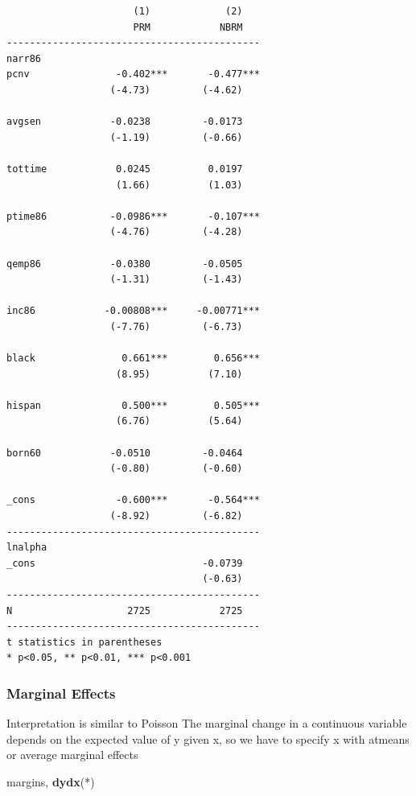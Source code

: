 \documentclass[
]{book}
\newenvironment{Shaded}{\begin{snugshade}}{\end{snugshade}}
\newcommand{\KeywordTok}[1]{\textcolor[rgb]{0.13,0.29,0.53}{\textbf{#1}}}
\newcommand{\NormalTok}[1]{#1}
\begin{document}
\begin{verbatim}
                      (1)             (2)   
                      PRM            NBRM   
--------------------------------------------
narr86                                      
pcnv               -0.402***       -0.477***
                  (-4.73)         (-4.62)   

avgsen            -0.0238         -0.0173   
                  (-1.19)         (-0.66)   

tottime            0.0245          0.0197   
                   (1.66)          (1.03)   

ptime86           -0.0986***       -0.107***
                  (-4.76)         (-4.28)   

qemp86            -0.0380         -0.0505   
                  (-1.31)         (-1.43)   

inc86            -0.00808***     -0.00771***
                  (-7.76)         (-6.73)   

black               0.661***        0.656***
                   (8.95)          (7.10)   

hispan              0.500***        0.505***
                   (6.76)          (5.64)   

born60            -0.0510         -0.0464   
                  (-0.80)         (-0.60)   

_cons              -0.600***       -0.564***
                  (-8.92)         (-6.82)   
--------------------------------------------
lnalpha                                     
_cons                             -0.0739   
                                  (-0.63)   
--------------------------------------------
N                    2725            2725   
--------------------------------------------
t statistics in parentheses
* p<0.05, ** p<0.01, *** p<0.001
\end{verbatim}

\subsubsection*{Marginal Effects}\label{marginal-effects-1}

Interpretation is similar to Poisson
The marginal change in a continuous variable depends on the expected value of y
given x, so we have to specify x with atmeans or average marginal effects

\begin{Shaded}
\begin{Highlighting}[]
\NormalTok{margins, }\KeywordTok{dydx}\NormalTok{(*)}
\end{Highlighting}
\end{Shaded}
\end{document}
